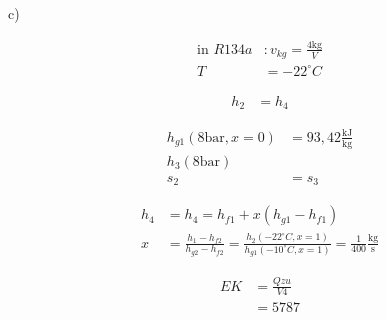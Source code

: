 c)

\begin{align*}
\text{in } R134a & : v_{kg} = \frac{4 \text{kg}}{V} \\
T & = -22^\circ C
\end{align*}


\begin{align*}
h_2 & = h_4
\end{align*}


\begin{align*}
h_{g1} (8 \text{bar}, x = 0) & = 93,42 \frac{\text{kJ}}{\text{kg}} \\
h_3 (8 \text{bar}) & \\
s_2 & = s_3
\end{align*}

\begin{align*}
h_4 & = h_4 = h_{f1} + x (h_{g1} - h_{f1}) \\
x & = \frac{h_1 - h_{f2}}{h_{g2} - h_{f2}} = \frac{h_2 (-22^\circ C, x = 1)}{h_{g1} (-10^\circ C, x = 1)} = \frac{1}{400} \frac{\text{kg}}{\text{s}}
\end{align*}

\begin{align*}
EK & = \frac{Qzu}{V4} \\
& = 5787
\end{align*}